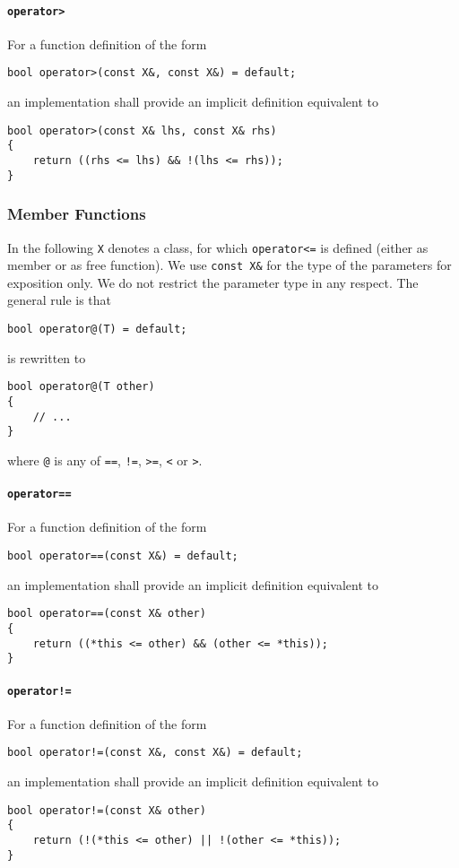 ﻿\documentclass[a4paper,11pt,final]{article}
\begin{document}
\paragraph{\texttt{operator>}}
For a function definition of the form
\begin{verbatim}
bool operator>(const X&, const X&) = default;
\end{verbatim}
an implementation shall provide an implicit definition equivalent to
\begin{verbatim}
bool operator>(const X& lhs, const X& rhs)
{
    return ((rhs <= lhs) && !(lhs <= rhs));
}
\end{verbatim}

\subsubsection{Member Functions}
In the following \verb|X| denotes a class, for which \verb|operator<=| is defined (either as member or as free function). We use \verb|const X&| for the type of the parameters for exposition only. We do not restrict the parameter type in any respect. The general rule is that
\begin{verbatim}
bool operator@(T) = default;
\end{verbatim}
is rewritten to
\begin{verbatim}
bool operator@(T other)
{
    // ...
}
\end{verbatim}
where \verb|@| is any of \verb|==|, \verb|!=|, \verb|>=|, \verb|<| or \verb|>|.

\paragraph{\texttt{operator==}}
For a function definition of the form
\begin{verbatim}
bool operator==(const X&) = default;
\end{verbatim}
an implementation shall provide an implicit definition equivalent to
\begin{verbatim}
bool operator==(const X& other)
{
    return ((*this <= other) && (other <= *this));
}
\end{verbatim}

\paragraph{\texttt{operator!=}}
For a function definition of the form
\begin{verbatim}
bool operator!=(const X&, const X&) = default;
\end{verbatim}
an implementation shall provide an implicit definition equivalent to
\begin{verbatim}
bool operator!=(const X& other)
{
    return (!(*this <= other) || !(other <= *this));
}
\end{verbatim}
\end{document}
